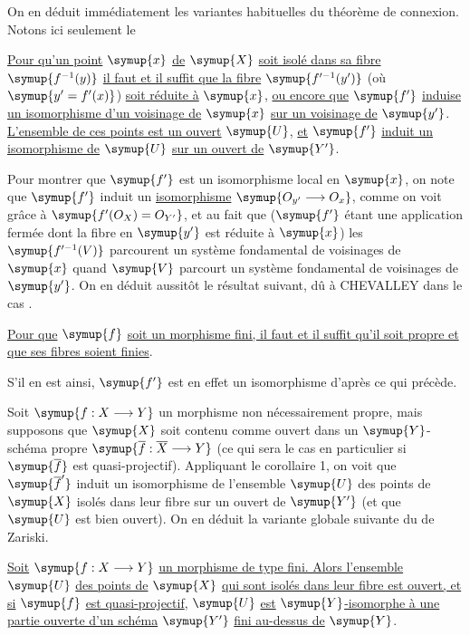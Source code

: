 On en déduit immédiatement les variantes habituelles du théorème de connexion.
Notons ici seulement le

 \uline{Pour qu'un point} $\symup{x}$ \uline{de} $\symup{X}$ \uline{soit isolé dans sa fibre}
$\symup{f^{-1}(y)}$ \uline{il faut et il suffit que la fibre} $\symup{f'^{-1}(y')}$ (où
$\symup{y'=f'(x)}$) \uline{soit réduite à} $\symup{x}$, \uline{ou encore que} $\symup{f'}$ \uline{induise un isomorphisme
d'un voisinage de} $\symup{x}$ \uline{sur un voisinage de} $\symup{y'}$. \uline{L'ensemble de ces points est
un ouvert} $\symup{U}$, \uline{et} $\symup{f'}$ \uline{induit un isomorphisme de} $\symup{U}$ \uline{sur un ouvert de} $\symup{Y'}$.

Pour montrer que $\symup{f'}$ est un isomorphisme local en $\symup{x}$, on note que $\symup{f'}$ induit
un \uline{isomorphisme} $\symup{O_{y'}\longrightarrow O_x}$, comme on voit grâce à
$\symup{f'(O_X)=O_{Y'}}$, et au fait que ($\symup{f'}$ étant une application fermée
dont la fibre en $\symup{y'}$ est réduite à $\symup{x}$) les $\symup{f'^{-1}(V)}$ parcourent un
système fondamental de voisinages de $\symup{x}$ quand $\symup{V}$ parcourt un système
fondamental de voisinages de $\symup{y'}$. On en déduit aussitôt le résultat suivant,
dû à CHEVALLEY dans le cas .

 \uline{Pour que} $\symup{f}$ \uline{soit un morphisme fini, il faut et il
suffit qu'il soit propre et que ses fibres soient finies}.

S'il en est ainsi, $\symup{f'}$ est en effet un isomorphisme d'après ce qui précède.

Soit $\symup{f:X\longrightarrow Y}$ un morphisme non nécessairement propre, mais
supposons que $\symup{X}$ soit contenu comme ouvert dans un $\symup{Y}$-schéma propre
$\symup{\overline f:\overline X\longrightarrow Y}$ (ce qui sera le cas en
particulier si $\symup{\overline f}$ est quasi-projectif). Appliquant le corollaire 1, on voit que
$\symup{\overline f'}$ induit un isomorphisme de l'ensemble $\symup{U}$ des points de $\symup{X}$
isolés dans leur fibre sur un ouvert de $\symup{Y'}$ (et que $\symup{U}$ est bien ouvert). On
en déduit la variante globale suivante du  de Zariski.

 \uline{Soit}
$\symup{f:X\longrightarrow Y}$ \uline{un morphisme de type fini. Alors l'ensemble} $\symup{U}$ \uline{des
points de} $\symup{X}$ \uline{qui sont isolés dans leur fibre est ouvert, et si} $\symup{f}$ \uline{est
quasi-projectif}, $\symup{U}$ \uline{est}
$\symup{Y}$\uline{-isomorphe à une partie ouverte d'un schéma} $\symup{Y'}$ \uline{fini au-dessus de} $\symup{Y}$.

